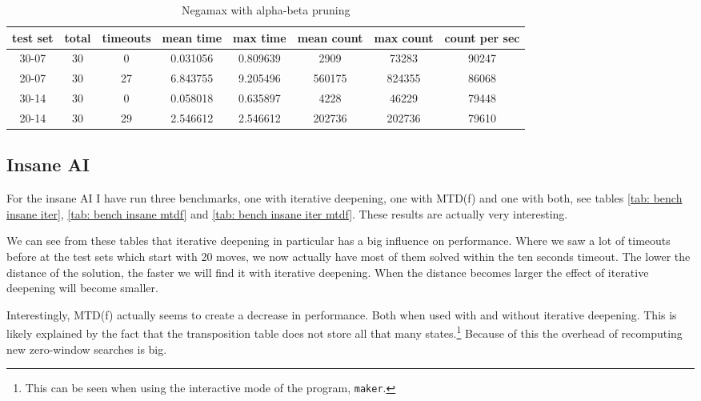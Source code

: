 \documentclass[a4paper]{article}
\begin{document}
\begin{table}[h]
	\centering
	\begin{adjustbox}{center}
	\begin{tabular}{|c|c|c|c|c|c|c|c|}\hline
	\textbf{test set} & \textbf{total} & \textbf{timeouts} & \textbf{mean time} & \textbf{max time} & \textbf{mean count} & \textbf{max count} & \textbf{count per sec} \\\hline
	30-07 & 30 & 0 & 0.031056 & 0.809639 & 2909 & 73283 & 90247 \\\hline
	20-07 & 30 & 27 & 6.843755 & 9.205496 & 560175 & 824355 & 86068 \\\hline
	30-14 & 30 & 0 & 0.058018 & 0.635897 & 4228 & 46229 & 79448 \\\hline
	20-14 & 30 & 29 & 2.546612 & 2.546612 & 202736 & 202736 & 79610 \\\hline
	\end{tabular}
	\end{adjustbox}
	\caption{Negamax with alpha-beta pruning}
	\label{tab: bench alpha beta}
\end{table}

\subsection{Insane AI}
For the insane AI I have run three benchmarks, one with iterative deepening,
one with MTD(f) and one with both, see tables \ref{tab: bench insane iter},
\ref{tab: bench insane mtdf} and \ref{tab: bench insane iter mtdf}. These
results are actually very interesting.

We can see from these tables that iterative deepening in particular has a big
influence on performance. Where we saw a lot of timeouts before at the test
sets which start with 20 moves, we now actually have most of them solved within
the ten seconds timeout. The lower the distance of the solution, the faster we
will find it with iterative deepening. When the distance becomes larger the
effect of iterative deepening will become smaller.

Interestingly, MTD(f) actually seems to create a decrease in performance. Both
when used with and without iterative deepening. This is likely explained by the
fact that the transposition table does not store all that many
states.\footnote{This can be seen when using the interactive mode of the
program, \texttt{maker}.} Because of this the overhead of recomputing new
zero-window searches is big.
\end{document}

